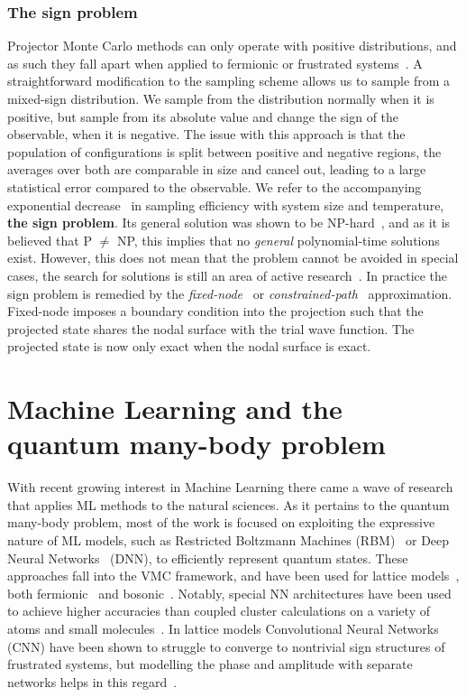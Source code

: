\subsubsection{The sign problem}
Projector Monte Carlo methods can only operate with positive distributions, and as such they fall apart when applied to fermionic or frustrated systems~\cite{gubernatis_kawashima_werner_2016}. A straightforward modification to the sampling scheme allows us to sample from a mixed-sign distribution. We sample from the distribution normally when it is positive, but sample from its absolute value and change the sign of the observable, when it is negative. The issue with this approach is that the population of configurations is split between positive and negative regions, the averages over both are comparable in size and cancel out, leading to a large statistical error compared to the observable. We refer to the accompanying exponential decrease~\cite{gubernatis_kawashima_werner_2016} in sampling efficiency with system size and temperature, \textbf{the sign problem}. Its general solution was shown to be NP-hard~\cite{troyer2005computational}, and as it is believed that P $\neq$ NP, this implies that no \emph{general} polynomial-time solutions exist. However, this does not mean that the problem cannot be avoided in special cases, the search for solutions is still an area of active research~\cite{hutcheon2020stochastic, assaraf2007fermion, alexandru2020complex}. In practice the sign problem is remedied by the \emph{fixed-node}~\cite{anderson1975random} or \emph{constrained-path}~\cite{zhang1997constrained} approximation. Fixed-node imposes a boundary condition into the projection such that the projected state shares the nodal surface with the trial wave function. The projected state is now only exact when the nodal surface is exact.

\section{Machine Learning and the quantum many-body problem}
With recent growing interest in Machine Learning there came a wave of research that applies ML methods to the natural sciences. As it pertains to the quantum many-body problem, most of the work is focused on exploiting the expressive nature of ML models, such as Restricted Boltzmann Machines (RBM)~\cite{carleo2017solving} or Deep Neural Networks~\cite{cai2018approximating} (DNN), to efficiently represent quantum states. These approaches fall into the VMC framework, and have been used for lattice models~\cite{carleo2017solving}, both fermionic~\cite{nomura2017restricted} and bosonic~\cite{saito2017solving}. Notably, special NN architectures have been used to achieve higher accuracies than coupled cluster calculations on a variety of atoms and small molecules~\cite{pfau2020ab, spencer2020better}. In lattice models Convolutional Neural Networks (CNN) have been shown to struggle to converge to nontrivial sign structures of frustrated systems, but modelling the phase and amplitude with separate networks helps in this regard~\cite{szabo2020neural}.

